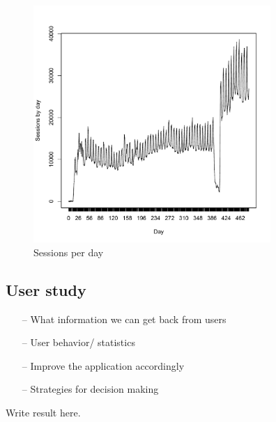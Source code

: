 \begin{figure}[htb]
\centering \includegraphics[height=9cm]{charts/sessions_per_day}
\caption{Sessions per day \label{sessions_perday}}
\end{figure}

\subsection{User study}
\begin{itemize}
\item[--]What information we can get back from users
\item[--]User behavior/ statistics
\item[--]Improve the application accordingly
\item[--]Strategies for decision making
\end{itemize}
Write result here.